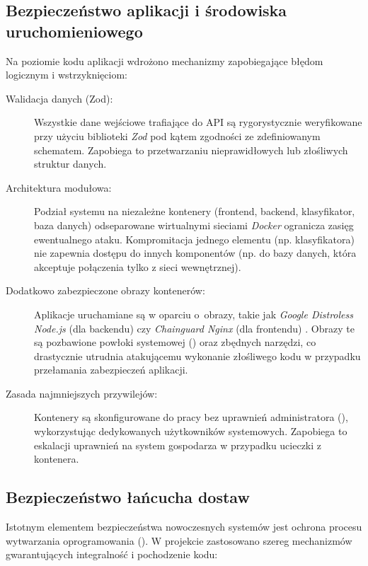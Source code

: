 \subsection{Bezpieczeństwo aplikacji i środowiska uruchomieniowego}

Na poziomie kodu aplikacji wdrożono mechanizmy zapobiegające błędom logicznym i wstrzyknięciom:

\begin{description}
	\item[Walidacja danych (Zod):] Wszystkie dane wejściowe trafiające do API są rygorystycznie weryfikowane przy użyciu biblioteki \textit{Zod} pod kątem zgodności ze zdefiniowanym schematem. Zapobiega to przetwarzaniu nieprawidłowych lub złośliwych struktur danych.
	\item[Architektura modułowa:] Podział systemu na niezależne kontenery (frontend, backend, klasyfikator, baza danych) odseparowane wirtualnymi sieciami \textit{Docker} ogranicza zasięg ewentualnego ataku. Kompromitacja jednego elementu (np. klasyfikatora) nie zapewnia dostępu do innych komponentów (np. do bazy danych, która akceptuje połączenia tylko z sieci wewnętrznej).
	\item[Dodatkowo zabezpieczone obrazy kontenerów:] Aplikacje uruchamiane są w oparciu o~obrazy, takie jak \textit{Google Distroless Node.js} \cite{google_distroless} (dla backendu) czy \textit{Chainguard Nginx} (dla frontendu) \cite{nginx_chainguard}. Obrazy te są pozbawione powłoki systemowej () oraz zbędnych narzędzi, co drastycznie utrudnia atakującemu wykonanie złośliwego kodu w przypadku przełamania zabezpieczeń aplikacji.
	\item[Zasada najmniejszych przywilejów:] Kontenery są skonfigurowane do pracy bez uprawnień administratora (), wykorzystując dedykowanych użytkowników systemowych. Zapobiega to eskalacji uprawnień na system gospodarza w przypadku ucieczki z kontenera.
\end{description}

\subsection{Bezpieczeństwo łańcucha dostaw}

Istotnym elementem bezpieczeństwa nowoczesnych systemów jest ochrona procesu wytwarzania oprogramowania (). W projekcie zastosowano szereg mechanizmów gwarantujących integralność i pochodzenie kodu:

